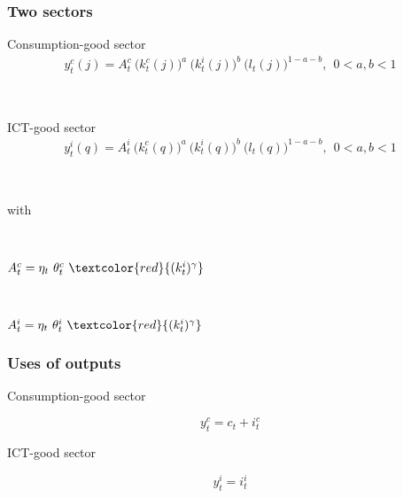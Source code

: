 \documentclass{beamer}
\begin{document}
\begin{frame}
	\frametitle{Two sectors}

Consumption-good sector
\begin{eqnarray}\label{equation:production_FINAL}
y^c_t(j) = A^c_t \ \big( k^c_{t}(j) \big)^a \ \big( k^i_{t}(j) \big)^b \ \big( l_{t}(j) \big)^{1-a-b}, \ \ 0 < a,b < 1
\end{eqnarray}

\

ICT-good sector
\begin{eqnarray}\label{equation:productionICT}
y^i_t(q) = A_t^i \ \big( k^c_{t}(q) \big)^a \ \big( k^i_{t}(q) \big)^b \ \big( l_{t}(q) \big)^{1-a-b}, \ \ 0 < a,b < 1
\end{eqnarray}

\

with 

\

\centering
$ A_t^c = \eta_t \ \theta^c_t \ \textcolor{red}{(k^i_{t})^{\gamma}}  $

\

$A_t^i = \eta_t \ \theta^i_t \ \textcolor{red}{(k^i_{t})^{\gamma}} $	

\end{frame}

\begin{frame}
	\frametitle{Uses of outputs}
	\label{uses}

Consumption-good sector

$$
y^c_t = c_t + i^c_t
$$

ICT-good sector


$$
y^i_t = i^i_t
$$

\


\

\hyperlink{tfp_in_model}{}	


\end{frame}
\end{document}
